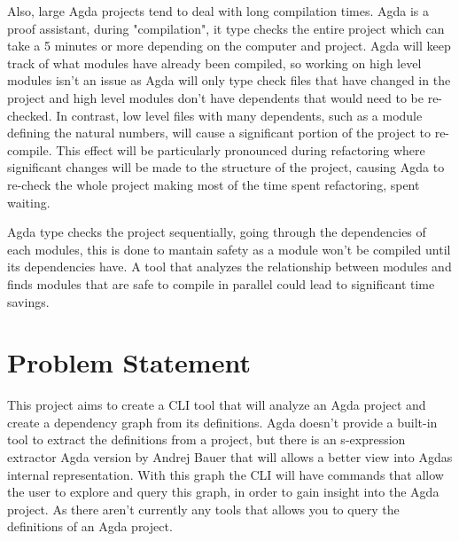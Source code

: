 Also, large Agda projects tend to deal with long compilation times. Agda is a
proof assistant, during "compilation", it type checks the entire project which
can take a 5 minutes or more depending on the computer and project. Agda will
keep track of what modules have already been compiled, so working on high level
modules isn't an issue as Agda will only type check files that have changed in
the project and high level modules don't have dependents that would need to be
re-checked. In contrast, low level files with many dependents, such as a module
defining the natural numbers, will cause a significant portion of the project
to re-compile. This effect will be particularly pronounced during refactoring
where significant changes will be made to the structure of the project, causing
Agda to re-check the whole project making most of the time spent refactoring,
spent waiting. 

Agda type checks the project sequentially, going through the dependencies of
each modules, this is done to mantain safety as a module won't be compiled
until its dependencies have. A tool that analyzes the relationship between
modules and finds modules that are safe to compile in parallel could lead to
significant time savings.




\section{Problem Statement}

This project aims to create a CLI tool that will analyze an Agda project and
create a dependency graph from its definitions. Agda doesn't provide a built-in
tool to extract the definitions from a project, but there is an s-expression
extractor Agda version by Andrej Bauer \cite{andrej} that will allows a better
view into Agdas internal representation. With this graph the CLI will have
commands that allow the user to explore and query this graph, in order to gain
insight into the Agda project. As there aren't currently any tools that allows
you to query the definitions of an Agda project.

